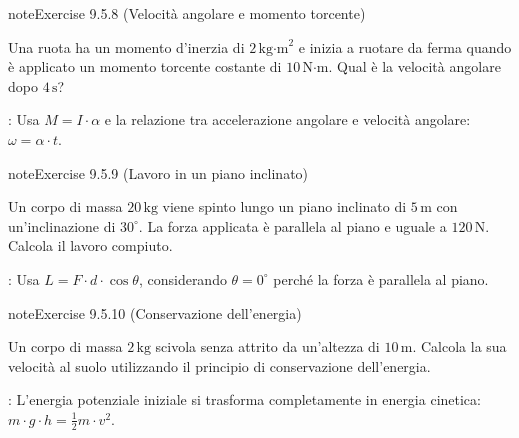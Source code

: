 \documentclass[letterpaper,10pt,italian]{jupyterBook}
\begin{document}
\begin{sphinxadmonition}{note}{Exercise 9.5.8 (Velocità angolare e momento torcente)}



\sphinxAtStartPar
Una ruota ha un momento d’inerzia di \(2 \, \text{kg·m}^2\) e inizia a ruotare da ferma quando è applicato un momento torcente costante di \(10 \, \text{N·m}\). Qual è la velocità angolare dopo \(4 \, \text{s}\)?

\sphinxAtStartPar
{}: Usa \( M = I \cdot \alpha \) e la relazione tra accelerazione angolare e velocità angolare: \( \omega = \alpha \cdot t \).
\end{sphinxadmonition}
 \label{exercise:ch/mechanics/actions-problems-exercise-8}

\begin{sphinxadmonition}{note}{Exercise 9.5.9 (Lavoro in un piano inclinato)}



\sphinxAtStartPar
Un corpo di massa \(20 \, \text{kg}\) viene spinto lungo un piano inclinato di \(5 \, \text{m}\) con un’inclinazione di \(30^\circ\). La forza applicata è parallela al piano e uguale a \(120 \, \text{N}\). Calcola il lavoro compiuto.

\sphinxAtStartPar
{}: Usa \( L = F \cdot d \cdot \cos\theta \), considerando \(\theta = 0^\circ\) perché la forza è parallela al piano.
\end{sphinxadmonition}
 \label{exercise:ch/mechanics/actions-problems-exercise-9}

\begin{sphinxadmonition}{note}{Exercise 9.5.10 (Conservazione dell’energia)}



\sphinxAtStartPar
Un corpo di massa \(2 \, \text{kg}\) scivola senza attrito da un’altezza di \(10 \, \text{m}\). Calcola la sua velocità al suolo utilizzando il principio di conservazione dell’energia.

\sphinxAtStartPar
{}: L’energia potenziale iniziale si trasforma completamente in energia cinetica: \( m \cdot g \cdot h = \frac{1}{2} m \cdot v^2 \).
\end{sphinxadmonition}

\sphinxstepscope
\end{document}

